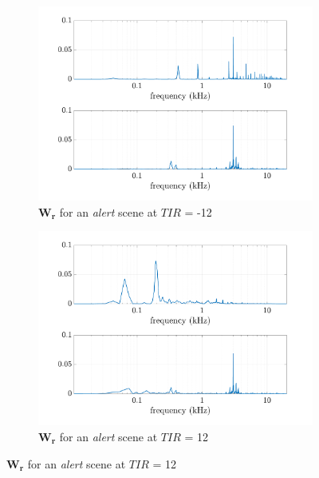 \documentclass[twocolumn,a4paper,10pt]{article}
\begin{document}
\begin{figure}[t!]
    \centering
    \begin{subfigure}[t]{0.45\textwidth}
        \centering
        \includegraphics[width=\linewidth]{../image/Y_alert_TPR_-12_01.pdf}
        \caption{$\mathbf{W_r}$ for an \textit{alert} scene at $TIR$ = -12}
        \label{fig:Y_alert-12}
    \end{subfigure}%
    \hfill
    \begin{subfigure}[t]{0.45\textwidth}
        \centering
        \includegraphics[width=\linewidth]{../image/Y_alert_TPR_12_01.pdf}
        \caption{$\mathbf{W_r}$ for an \textit{alert} scene at $TIR$ = 12}
		\label{fig:Y_alert_12}
    \end{subfigure}
\end{figure}
    
\end{document}
